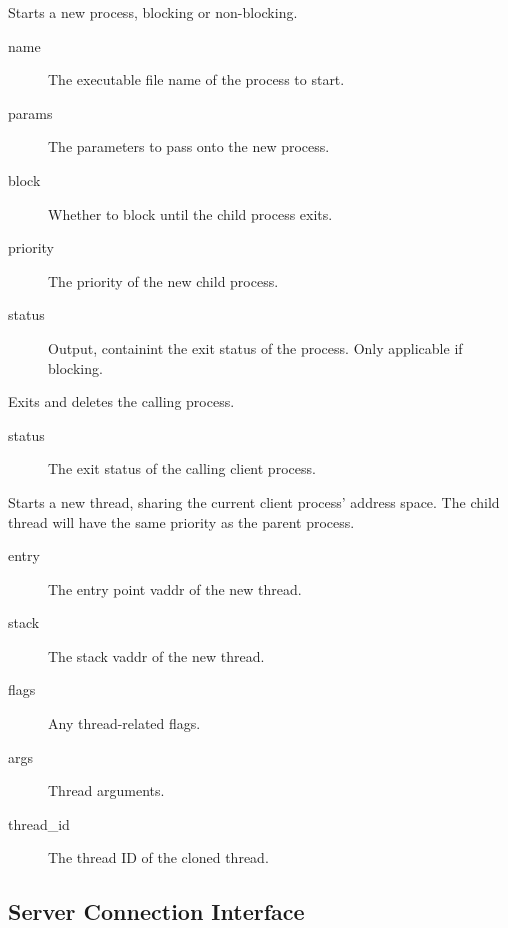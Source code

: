 \begin{description}
	\item {}
	Starts a new process, blocking or non-blocking.
    \begin{description}
        \item [name] The executable file name of the process to start.
        \item [params] The parameters to pass onto the new process.
        \item [block] Whether to block until the child process exits.
        \item [priority] The priority of the new child process.
        \item [status] Output, containint the exit status of the process. Only applicable if
                       blocking.
    \end{description}

    \item {}
    Exits and deletes the calling process.
    \begin{description}
        \item [status] The exit status of the calling client process.
    \end{description}

    \item {}
    Starts a new thread, sharing the current client process' address space. The child
    thread will have the same priority as the parent process.
    \begin{description}
        \item [entry] The entry point vaddr of the new thread.
        \item [stack] The stack vaddr of the new thread.
        \item [flags] Any thread-related flags.
        \item [args] Thread arguments.
        \item [thread\_id] The thread ID of the cloned thread.
    \end{description}

\end{description}

\subsection{Server Connection Interface}

